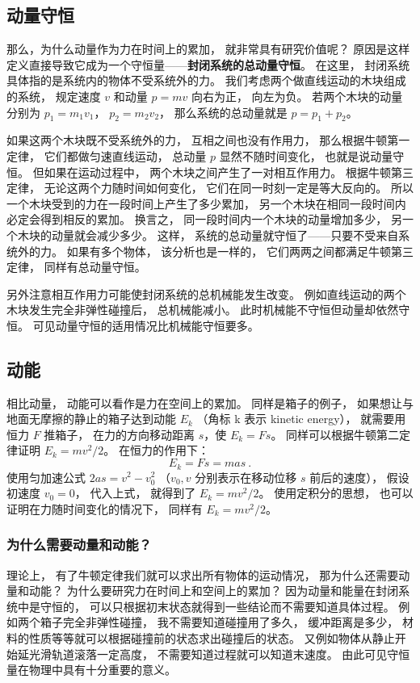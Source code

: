 \subsection{动量守恒}
那么，为什么动量作为力在时间上的累加， 就非常具有研究价值呢？ 原因是这样定义直接导致它成为一个守恒量——\textbf{封闭系统的总动量守恒}。 在这里， 封闭系统具体指的是系统内的物体不受系统外的力。 我们考虑两个做直线运动的木块组成的系统， 规定速度 $v$ 和动量 $p = mv$ 向右为正， 向左为负。 若两个木块的动量分别为 $p_1 = m_1 v_1$， $p_2 = m_2 v_2$， 那么系统的总动量就是 $p = p_1 + p_2$。

如果这两个木块既不受系统外的力， 互相之间也没有作用力， 那么根据牛顿第一定律， 它们都做匀速直线运动， 总动量 $p$ 显然不随时间变化， 也就是说动量守恒。 但如果在运动过程中， 两个木块之间产生了一对相互作用力。 根据牛顿第三定律， 无论这两个力随时间如何变化， 它们在同一时刻一定是等大反向的。 所以一个木块受到的力在一段时间上产生了多少累加， 另一个木块在相同一段时间内必定会得到相反的累加。 换言之， 同一段时间内一个木块的动量增加多少， 另一个木块的动量就会减少多少。 这样， 系统的总动量就守恒了——只要不受来自系统外的力。 如果有多个物体， 该分析也是一样的， 它们两两之间都满足牛顿第三定律， 同样有总动量守恒。

另外注意相互作用力可能使封闭系统的总机械能发生改变。 例如直线运动的两个木块发生完全非弹性碰撞后， 总机械能减小。 此时机械能不守恒但动量却依然守恒。 可见动量守恒的适用情况比机械能守恒要多。

\subsection{动能}
相比动量， 动能可以看作是力在空间上的累加。 同样是箱子的例子， 如果想让与地面无摩擦的静止的箱子达到动能 $E_k$ （角标 k 表示 kinetic energy）， 就需要用恒力 $F$ 推箱子， 在力的方向移动距离 $s$，使 $E_k = Fs$。 同样可以根据牛顿第二定律证明 $E_k = mv^2/2$。 在恒力的作用下：
\begin{equation}
E_k = Fs = mas~.
\end{equation}
使用匀加速公式 $2as = v^2 - v_0^2$ （$v_0, v$ 分别表示在移动位移 $s$ 前后的速度）， 假设初速度 $v_0 = 0$， 代入上式， 就得到了 $E_k = mv^2/2$。 使用定积分的思想， 也可以证明在力随时间变化的情况下， 同样有 $E_k = mv^2/2$。

\subsubsection{为什么需要动量和动能？}
理论上， 有了牛顿定律我们就可以求出所有物体的运动情况， 那为什么还需要动量和动能？ 为什么要研究力在时间上和空间上的累加？ 因为动量和能量在封闭系统中是守恒的， 可以只根据初末状态就得到一些结论而不需要知道具体过程。 例如两个箱子完全非弹性碰撞， 我不需要知道碰撞用了多久， 缓冲距离是多少， 材料的性质等等就可以根据碰撞前的状态求出碰撞后的状态。 又例如物体从静止开始延光滑轨道滚落一定高度， 不需要知道过程就可以知道末速度。 由此可见守恒量在物理中具有十分重要的意义。

